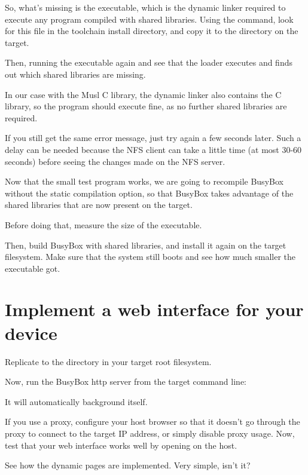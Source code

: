 So, what's missing is the 
executable, which is the dynamic linker required to execute any
program compiled with shared libraries. Using the 
command, look for this file in the toolchain install directory,
and copy it to the  directory on the target.

Then, running the executable again and see that the loader executes
and finds out which shared libraries are missing.

In our case with the Musl C library, the dynamic linker also contains the
C library, so the program should execute fine, as no further shared
libraries are required.

If you still get the same error message, just try again a
few seconds later.  Such a delay can be needed because the NFS
client can take a little time (at most 30-60 seconds) before
seeing the changes made on the NFS server.

Now that the small test program works, we are going to recompile BusyBox
without the static compilation option, so that BusyBox takes
advantage of the shared libraries that are now present on the target.

Before doing that, measure the size of the  executable.

Then, build BusyBox with shared libraries, and install it again on the
target filesystem. Make sure that the system still boots and see how
much smaller the  executable got.

\section{Implement a web interface for your device}

Replicate  to the  directory in your target
root filesystem.

Now, run the BusyBox http server from the target command line:


It will automatically background itself.

If you use a proxy, configure your host browser so that it doesn't go
through the proxy to connect to the target IP address, or simply
disable proxy usage.  Now, test that your web interface works well by
opening  on the host.

See how the dynamic pages are implemented. Very simple, isn't it?

